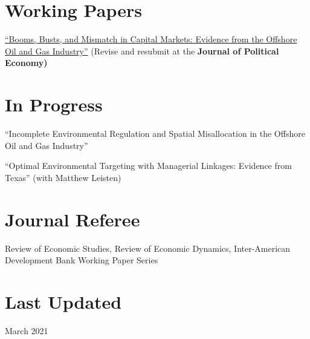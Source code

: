 \documentclass[margin,line]{res}
\newenvironment{list1}{
  \begin{list}{\ding{113}}{%
      \setlength{\itemsep}{.025in}
      \setlength{\parsep}{0in} \setlength{\parskip}{0in}
      \setlength{\topsep}{0in} \setlength{\partopsep}{0in}
      \setlength{\leftmargin}{0.17in}}}{\end{list}}
\newenvironment{list2}{
  \begin{list}{$\bullet$}{%
      \setlength{\itemsep}{0in}
      \setlength{\parsep}{0in} \setlength{\parskip}{0in}
      \setlength{\topsep}{0in} \setlength{\partopsep}{0in}
      \setlength{\leftmargin}{0.2in}}}{\end{list}}
\begin{document}
\begin{resume}
\section{Working Papers}
\begin{list1}
\item[] \href{https://nvreug.github.io/paper/bbm.pdf}{``Booms, Busts, and Mismatch in Capital Markets: Evidence from the Offshore Oil and Gas Industry''} (Revise and resubmit at the \bf{Journal of Political Economy})

\end{list1}

\section{In Progress}
\begin{list1}
	
	\item[] ``Incomplete Environmental Regulation and Spatial Misallocation in the Offshore Oil and Gas Industry''
	\item[] ``Optimal Environmental Targeting with Managerial Linkages: Evidence from Texas'' (with Matthew Leisten)
\end{list1}


\section{Journal Referee}
\begin{list1}
	\item[] Review of Economic Studies, Review of Economic Dynamics, Inter-American Development Bank Working Paper Series
\end{list1}

\section{Last Updated} 
	\begin{list1} 
		\item[] March 2021 
	\end{list1}

\end{resume}
\end{document}
